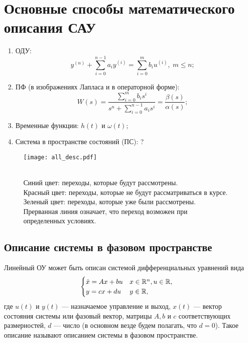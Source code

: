 \documentclass[../../TAU.tex]{subfiles}
\begin{document}
\section{Основные способы математического описания САУ}
    \begin{enumerate}
        \item ОДУ:
            $$
                y^{(n)}+\sum_{i=0}^{n-1}a_iy^{(i)}=\sum_{i=0}^{m}b_iu^{(i)},\; m \le n;
            $$
        \item ПФ (в изображениях Лапласа и в операторной форме):
            $$
                W(s) = \frac{\sum_{i=0}^{m}b_is^i}{s^n+\sum_{i=0}^{n-1}a_is^{i}} = \frac{\beta(s)}{\alpha(s)};
            $$
        \item Временные функции: $h(t)$ и $\omega(t)$;
        \item Система в пространстве состояний (ПС): ?
    \end{enumerate}

    \begin{figure}[!hb]
        \texttt{[image: all\_desc.pdf]}
        \caption
        {    
            {\\\color{blue} Синий цвет}: переходы, которые будут рассмотрены.\\
            {\color{red} Красный цвет}: переходы, которые не будут рассматриваться в курсе.\\
            {\color{green} Зеленый цвет}: переходы, которые уже были рассмотрены.\\
            Прерванная линия означает, что переход возможен при определенных условиях.
        }
    \end{figure}
    \FloatBarrier

\subsection{Описание системы в фазовом пространстве}
    
    Линейный ОУ может быть описан системой дифференциальных уравнений вида
    \begin{equation}\label{ST_DS}
        \begin{cases}
            \dot x = Ax+bu& x\in\mathbb{R}^{n},u\in\mathbb{R},\\
            y = cx +d u& y\in\mathbb{R},
        \end{cases}
    \end{equation}
    где $u(t)$ и $y(t)$ --- назначаемое управление и выход, $x(t)$ --- вектор состояния системы или фазовый вектор, матрицы $A,b$ и $c$ соответствующих размерностей, $d$ --- число (в основном везде будем полагать, что $d=0$). Такое описание называют описанием системы в фазовом пространстве.
\end{document}

